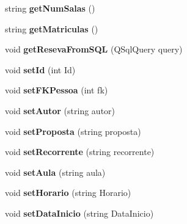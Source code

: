 \begin{DoxyCompactItemize}
\item 
string {\bfseries get\+Num\+Salas} ()\hypertarget{classReserva_a3e6baf3f88854ebe88b6b209251035a5}{}\label{classReserva_a3e6baf3f88854ebe88b6b209251035a5}

\item 
string {\bfseries get\+Matriculas} ()\hypertarget{classReserva_af8e7342afcd96c86a1009a1e79a3da9e}{}\label{classReserva_af8e7342afcd96c86a1009a1e79a3da9e}

\item 
void {\bfseries get\+Reseva\+From\+S\+QL} (Q\+Sql\+Query query)\hypertarget{classReserva_ad93b65c5d99d548abda549959005141e}{}\label{classReserva_ad93b65c5d99d548abda549959005141e}

\item 
void {\bfseries set\+Id} (int Id)\hypertarget{classReserva_a1f4a3a241ac2c88ba4fa12bb9e6a3a2d}{}\label{classReserva_a1f4a3a241ac2c88ba4fa12bb9e6a3a2d}

\item 
void {\bfseries set\+F\+K\+Pessoa} (int fk)\hypertarget{classReserva_a051e2b0ca449e2d6f7467bf47aab1702}{}\label{classReserva_a051e2b0ca449e2d6f7467bf47aab1702}

\item 
void {\bfseries set\+Autor} (string autor)\hypertarget{classReserva_a4f84c013fb7b919659778b41251fb52a}{}\label{classReserva_a4f84c013fb7b919659778b41251fb52a}

\item 
void {\bfseries set\+Proposta} (string proposta)\hypertarget{classReserva_a1ddb052a360ed197da22ef54b348d7de}{}\label{classReserva_a1ddb052a360ed197da22ef54b348d7de}

\item 
void {\bfseries set\+Recorrente} (string recorrente)\hypertarget{classReserva_a68089dd091db77e4ba144399b7b88956}{}\label{classReserva_a68089dd091db77e4ba144399b7b88956}

\item 
void {\bfseries set\+Aula} (string aula)\hypertarget{classReserva_ae64540d68df5a8511394c888a41bb0ec}{}\label{classReserva_ae64540d68df5a8511394c888a41bb0ec}

\item 
void {\bfseries set\+Horario} (string Horario)\hypertarget{classReserva_aba19e43e81eee7fc88e6f8a2188bf6aa}{}\label{classReserva_aba19e43e81eee7fc88e6f8a2188bf6aa}

\item 
void {\bfseries set\+Data\+Inicio} (string Data\+Inicio)\hypertarget{classReserva_a51f1349a18c489e6386c5856c385e131}{}\label{classReserva_a51f1349a18c489e6386c5856c385e131}


\end{DoxyCompactItemize}
